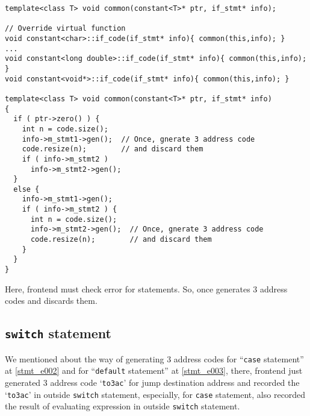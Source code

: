 \begin{verbatim}
template<class T> void common(constant<T>* ptr, if_stmt* info);

// Override virtual function
void constant<char>::if_code(if_stmt* info){ common(this,info); }
...
void constant<long double>::if_code(if_stmt* info){ common(this,info); }
void constant<void*>::if_code(if_stmt* info){ common(this,info); }

template<class T> void common(constant<T>* ptr, if_stmt* info)
{
  if ( ptr->zero() ) {
    int n = code.size();
    info->m_stmt1->gen();  // Once, gnerate 3 address code
    code.resize(n);        // and discard them
    if ( info->m_stmt2 )
      info->m_stmt2->gen();
  }
  else {
    info->m_stmt1->gen();
    if ( info->m_stmt2 ) {
      int n = code.size();
      info->m_stmt2->gen();  // Once, gnerate 3 address code
      code.resize(n);        // and discard them
    }
  }
}
\end{verbatim}
Here, frontend must check error for statements.
So, once generates 3 address codes and discards them.

\subsection{{\tt{switch}} statement}
\label{stmt_e005}
We mentioned about the way of generating 3 address codes for
``{\tt{case}} statement'' at \ref{stmt_e002} and
for ``{\tt{default}} statement'' at \ref{stmt_e003},
there, frontend just generated 3 address code `{\tt{to3ac}}' for
jump destination address and recorded the `{\tt{to3ac}}' in
outside {\tt{switch}} statement, especially, for {\tt{case}}
statement, also recorded the result of evaluating expression
in outside {\tt{switch}} statement.

